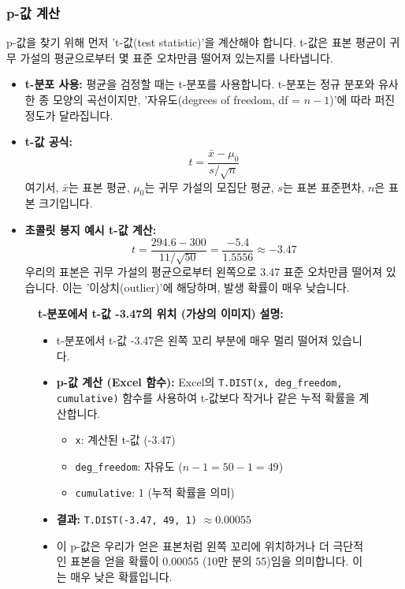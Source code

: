 \documentclass[11pt,a4paper]{book}
\providecommand{\captionof}[2]{\textbf{#2}}
\theoremstyle{definition}
\begin{document}
\subsubsection*{p-값 계산}

p-값을 찾기 위해 먼저 't-값(test statistic)'을 계산해야 합니다. t-값은 표본 평균이 귀무 가설의 평균으로부터 몇 표준 오차만큼 떨어져 있는지를 나타냅니다.

\begin{itemize}
    \item \textbf{t-분포 사용:} 평균을 검정할 때는 t-분포를 사용합니다. t-분포는 정규 분포와 유사한 종 모양의 곡선이지만, '자유도(degrees of freedom, df = $n-1$)'에 따라 퍼진 정도가 달라집니다.
    \item \textbf{t-값 공식:}
    \[ t = \frac{\bar{x} - \mu_0}{s / \sqrt{n}} \]
    여기서, $\bar{x}$는 표본 평균, $\mu_0$는 귀무 가설의 모집단 평균, $s$는 표본 표준편차, $n$은 표본 크기입니다.
    \item \textbf{초콜릿 봉지 예시 t-값 계산:}
    \[ t = \frac{294.6 - 300}{11 / \sqrt{50}} = \frac{-5.4}{1.5556} \approx -3.47 \]
    우리의 표본은 귀무 가설의 평균으로부터 왼쪽으로 3.47 표준 오차만큼 떨어져 있습니다. 이는 '이상치(outlier)'에 해당하며, 발생 확률이 매우 낮습니다.
\end{itemize}

\begin{figure}[h!]
    \centering
    \captionof{figure}{t-분포에서 t-값 -3.47의 위치 (가상의 이미지)}
    \label{fig:t_value_location}
    \vspace{0.5em}
    \textbf{설명:}
    \begin{itemize}
        \item t-분포에서 t-값 -3.47은 왼쪽 꼬리 부분에 매우 멀리 떨어져 있습니다.
        \item \textbf{p-값 계산 (Excel 함수):} Excel의 \texttt{T.DIST(x, deg\_freedom, cumulative)} 함수를 사용하여 t-값보다 작거나 같은 누적 확률을 계산합니다.
        \begin{itemize}
            \item \texttt{x}: 계산된 t-값 (-3.47)
            \item \texttt{deg\_freedom}: 자유도 ($n-1 = 50-1 = 49$)
            \item \texttt{cumulative}: 1 (누적 확률을 의미)
        \end{itemize}
        \item \textbf{결과:} \texttt{T.DIST(-3.47, 49, 1)} $\approx 0.00055$
        \item 이 p-값은 우리가 얻은 표본처럼 왼쪽 꼬리에 위치하거나 더 극단적인 표본을 얻을 확률이 0.00055 (10만 분의 55)임을 의미합니다. 이는 매우 낮은 확률입니다.
    \end{itemize}
\end{figure}
\end{document}
